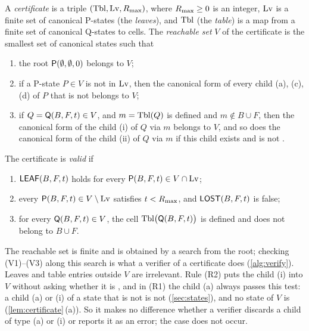 \begin{definition}[Certificate]\label{def:certificate}
A \emph{certificate} is a triple $(\mathrm{Tbl},\mathrm{Lv},R_{\max})$, where $R_{\max}\ge 0$ is an integer, $\mathrm{Lv}$ is a finite set
of canonical P-states (the \emph{leaves}), and $\mathrm{Tbl}$ (the \emph{table}) is a map from a finite set of
canonical Q-states to cells. The \emph{reachable set} $V$ of the certificate is the smallest set of
canonical states such that
\begin{enumerate}[label=\textup{(R\arabic*)},leftmargin=3em,start=0]
\item the root $\mathsf{P}(\emptyset,\emptyset,0)$ belongs to $V$;
\item if a P-state $P\in V$ is not in $\mathrm{Lv}$, then the canonical form of every child \textup{(a)},
  \textup{(c)}, \textup{(d)} of $P$ that is not \VOID{} belongs to $V$;
\item if $Q=\mathsf{Q}(B,F,t)\in V$, and $m=\mathrm{Tbl}(Q)$ is defined and $m\notin B\cup F$, then the canonical form of the
  child \textup{(i)} of $Q$ via $m$ belongs to $V$, and so does the canonical form of the child \textup{(ii)}
  of $Q$ via $m$ if this child exists and is not \VOID.
\end{enumerate}
The certificate is \emph{valid} if
\begin{enumerate}[label=\textup{(V\arabic*)},leftmargin=3em]
\item $\mathsf{LEAF}(B,F,t)$ holds for every $\mathsf{P}(B,F,t)\in V\cap\mathrm{Lv}$;
\item every $\mathsf{P}(B,F,t)\in V\setminus\mathrm{Lv}$ satisfies $t<R_{\max}$, and $\mathsf{LOST}(B,F,t)$ is false;
\item for every $\mathsf{Q}(B,F,t)\in V$, the cell $\mathrm{Tbl}\bigl(\mathsf{Q}(B,F,t)\bigr)$ is defined and does not belong to
  $B\cup F$.
\end{enumerate}
\end{definition}

The reachable set is finite and is obtained by a search from the root; checking (V1)--(V3) along this search
is what a verifier of a certificate does (\cref{alg:verify}). Leaves and table entries outside $V$
are irrelevant. Rule (R2) puts the child \textup{(i)} into $V$ without asking whether it is \VOID, and in
(R1) the child \textup{(a)} always passes this test: a child \textup{(a)} or \textup{(i)} of a state that is
not \VOID{} is not \VOID{} (\cref{sec:states}), and no state of $V$ is \VOID{} (\cref{lem:certificate}\,(a)).
So it makes no difference whether a verifier discards a \VOID{} child of type \textup{(a)} or \textup{(i)}
or reports it as an error; the case does not occur.

